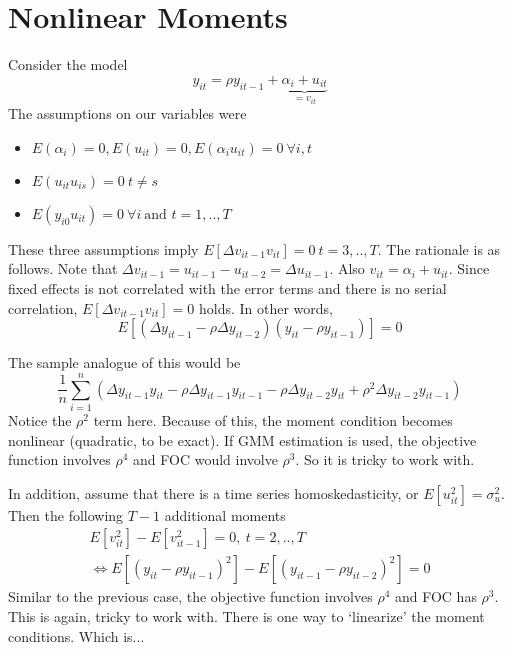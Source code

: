\section{Nonlinear Moments}
Consider the model
\[
y_{it}=\rho y_{it-1}+\underbrace{\alpha_i +u_{it}}_{=v_{it}} 
\]
The assumptions on our variables were
\begin{itemize}
\item $E(\alpha_i)=0, E(u_{it})=0, E(\alpha_i u_{it})=0 \ \forall i,t$
\item $E(u_{it}u_{is})=0\  t\neq s$
\item $E(y_{i0}u_{it})=0 \ \forall i \ \text{and }t=1,..,T$
\end{itemize}
These three assumptions imply $E[\Delta v_{it-1}v_{it}]=0 \ t=3,..,T$. The rationale is as follows. Note that $\Delta v_{it-1}= u_{it-1}-u_{it-2}=\Delta u_{it-1}$. Also $v_{it}=\alpha_i + u_{it}$. Since fixed effects is not correlated with the error terms and there is no serial correlation, $E[\Delta v_{it-1}v_{it}]=0$ holds. In other words, 
\[
E[(\Delta y_{it-1}-\rho\Delta y_{it-2})(y_{it}-\rho y_{it-1})]=0
\]\par
The sample analogue of this would be
\[
\frac{1}{n}\sum_{i=1}^n (\Delta y_{it-1}y_{it}-\rho\Delta y_{it-1}y_{it-1}-\rho \Delta y_{it-2}y_{it}+\rho^2\Delta y_{it-2}y_{it-1})
\]
Notice the $\rho^2$ term here. Because of this, the moment condition becomes nonlinear (quadratic, to be exact). If GMM estimation is used, the objective function involves $\rho^4$ and FOC would involve $\rho^3$. So it is tricky to work with.
\par
In addition, assume that there is a time series homoskedasticity, or $E[u_{it}^2]=\sigma_u^2$. Then the following $T-1$ additional moments
\begin{gather*}
E[v_{it}^2]-E[v_{it-1}^2]=0, \ t=2,..,T\\
\iff E[(y_{it}-\rho y_{it-1})^2]-E[(y_{it-1}-\rho y_{it-2})^2]=0
\end{gather*}
Similar to the previous case, the objective function involves $\rho^4$ and FOC has $\rho^3$. This is again, tricky to work with. There is one way to `linearize' the moment conditions. Which is...
